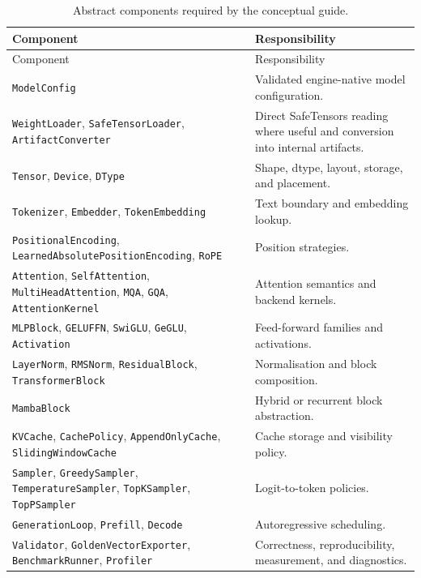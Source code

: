 {\scriptsize
\begin{longtable}{L{0.42\textwidth}L{0.52\textwidth}}
\caption{Abstract components required by the conceptual guide.}\\
\toprule
Component & Responsibility \\
\midrule
\endfirsthead
\toprule
Component & Responsibility \\
\midrule
\endhead
\texttt{ModelConfig} & Validated engine-native model configuration. \\
\texttt{WeightLoader}, \texttt{SafeTensorLoader}, \texttt{ArtifactConverter} & Direct SafeTensors reading where useful and conversion into internal artifacts. \\
\texttt{Tensor}, \texttt{Device}, \texttt{DType} & Shape, dtype, layout, storage, and placement. \\
\texttt{Tokenizer}, \texttt{Embedder}, \texttt{TokenEmbedding} & Text boundary and embedding lookup. \\
\texttt{PositionalEncoding}, \texttt{LearnedAbsolutePositionEncoding}, \texttt{RoPE} & Position strategies. \\
\texttt{Attention}, \texttt{SelfAttention}, \texttt{MultiHeadAttention}, \texttt{MQA}, \texttt{GQA}, \texttt{AttentionKernel} & Attention semantics and backend kernels. \\
\texttt{MLPBlock}, \texttt{GELUFFN}, \texttt{SwiGLU}, \texttt{GeGLU}, \texttt{Activation} & Feed-forward families and activations. \\
\texttt{LayerNorm}, \texttt{RMSNorm}, \texttt{ResidualBlock}, \texttt{TransformerBlock} & Normalisation and block composition. \\
\texttt{MambaBlock} & Hybrid or recurrent block abstraction. \\
\texttt{KVCache}, \texttt{CachePolicy}, \texttt{AppendOnlyCache}, \texttt{SlidingWindowCache} & Cache storage and visibility policy. \\
\texttt{Sampler}, \texttt{GreedySampler}, \texttt{TemperatureSampler}, \texttt{TopKSampler}, \texttt{TopPSampler} & Logit-to-token policies. \\
\texttt{GenerationLoop}, \texttt{Prefill}, \texttt{Decode} & Autoregressive scheduling. \\
\texttt{Validator}, \texttt{GoldenVectorExporter}, \texttt{BenchmarkRunner}, \texttt{Profiler} & Correctness, reproducibility, measurement, and diagnostics. \\
\bottomrule
\end{longtable}}



